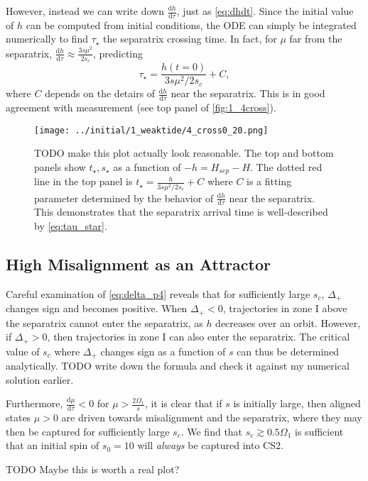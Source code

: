 \documentclass[
        fleqn,
        usenatbib,
    ]{mnras}
\newcommand*{\rd}[2]{\frac{\mathrm{d}#1}{\mathrm{d}#2}}
\begin{document}
However, instead we can write down $\rd{h}{\tau}$, just as \autoref{eq:dhdt}.
Since the initial value of $h$ can be computed from initial conditions, the ODE
can simply be integrated numerically to find $\tau_\star$ the separatrix
crossing time. In fact, for $\mu$ far from the separatrix, $\rd{h}{\tau} \approx
\frac{3s\mu^2}{2s_c}$, predicting
\begin{equation}
    \tau_\star = \frac{h(t = 0)}{3s\mu^2/2s_c} + C,\label{eq:tau_star}
\end{equation}
where $C$ depends on the detairs of $\rd{h}{\tau}$ near the separatrix. This is
in good agreement with measurement (see top panel of \autoref{fig:1_4cross}).
\begin{figure}
    \centering
    \texttt{[image: ../initial/1\_weaktide/4\_cross0\_20.png]}
    \caption{TODO make this plot actually look reasonable. The top and bottom
    panels show $t_\star, s_\star$ as a function of $-h = H_{sep} - H$. The
    dotted red line in the top panel is $t_\star = \frac{h}{3s\mu^2/2s_c} + C$
    where $C$ is a fitting parameter determined by the behavior of
    $\rd{h}{\tau}$ near the separatrix. This demonstrates that the separatrix
    arrival time is well-described by
    \autoref{eq:tau_star}.}\label{fig:1_4cross}
\end{figure}

\subsection{High Misalignment as an Attractor}

Careful examination of \autoref{eq:delta_p4} reveals that for sufficiently large
$s_c$, $\Delta_+$ changes sign and becomes positive. When $\Delta_+ < 0$,
trajectories in zone I above the separatrix cannot enter the separatrix, as $h$
decreases over an orbit. However, if $\Delta_+ > 0$, then trajectories in zone I
can also enter the separatrix. The critical value of $s_c$ where $\Delta_+$
changes sign as a function of $s$ can thus be determined analytically. TODO
write down the formula and check it against my numerical solution earlier.

Furthermore, $\rd{\mu}{\tau} < 0$ for $\mu > \frac{2\Omega_1}{s}$, it is clear
that if $s$ is initially large, then aligned states $\mu > 0$ are driven towards
misalignment and the separatrix, where they may then be captured for
sufficiently large $s_c$. We find that $s_c \gtrsim 0.5 \Omega_1$ is sufficient
that an initial spin of $s_0 = 10$ will \emph{always} be captured into CS2.

TODO Maybe this is worth a real plot?





\label{lastpage} %
\end{document}
